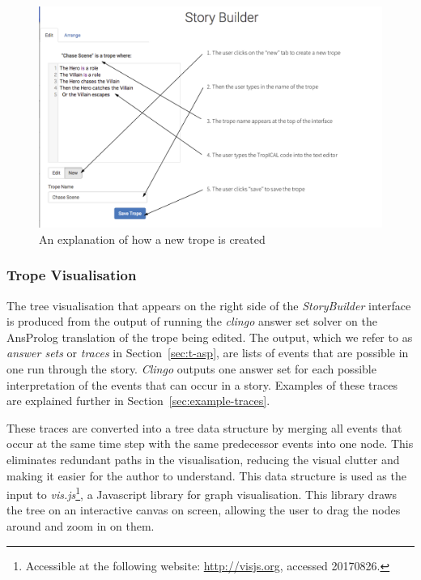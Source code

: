 \documentclass[11pt]{report}
\begin{document}
\begin{figure}[!t]
\centerline{\includegraphics[width=\textwidth]{storybuilder-new1.png}}
\caption{An explanation of how a new trope is created}\label{fig:sb-new-ann}
\end{figure}

\subsubsection{Trope Visualisation}
\label{sec:trope-visualisation}
The tree visualisation that appears on the right side of the \emph{StoryBuilder}
interface is produced from the output of running the \emph{clingo} answer set
solver on the AnsProlog translation of the trope being edited. The output,
which we refer to as \emph{answer sets} or \emph{traces} in Section~\ref{sec:t-asp}, are lists of events that are possible in one run
through the story. \emph{Clingo} outputs one answer set for each possible
interpretation of the events that can occur in a story. Examples of these traces
are explained further in Section~\ref{sec:example-traces}.

These traces are converted into a tree data structure by merging all events that
occur at the same time step with the same predecessor events into one node. This
eliminates redundant paths in the visualisation, reducing the visual clutter and
making it easier for the author to understand. This data structure is used as
the input to \emph{vis.js}\footnote{Accessible at the following website:
  \url{http://visjs.org}, accessed 20170826.}, a Javascript library for graph visualisation. This
library draws the tree on an interactive canvas on screen, allowing the user to
drag the nodes around and zoom in on them.
\end{document}
